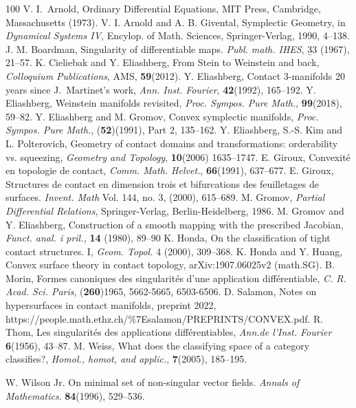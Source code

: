 \documentclass[12pt]{amsart}
\theoremstyle{plain}
\theoremstyle{definition}
\theoremstyle{remark}
\begin{document}

\begin{thebibliography}{100}
 V. I.~Arnold,   Ordinary Differential Equations,
  MIT Press, Cambridge, Massachusetts (1973). 
   V. I. Arnold and A. B. Givental, Symplectic Geometry, in  {\em Dynamical Systems IV}, Encylop. of Math. Sciences, Springer-Verlag, 1990, 4--138.
 J. M. Boardman, Singularity of differentiable maps. {\em Publ. math. IHES}, {\b 33} (1967), 21--57.
 K. Cieliebak and Y. Eliashberg, From Stein to Weinstein and back, {\em Colloquium Publications},  AMS,
 {\bf 59}(2012).
  Y. Eliashberg, {Contact 3-manifolds 20 years since J.~Martinet's work},
 {\sl Ann. Inst. Fourier}, {\bf 42}(1992), 165--192.
  Y. Eliashberg, Weinstein manifolds revisited,   {\it Proc. Sympos. Pure Math.}, {\bf 99}(2018),   59--82. 
   Y. Eliashberg and M. Gromov, Convex symplectic manifolds, {\em Proc. 
Sympos. Pure Math.},
({\bf 52})(1991), Part 2, 135--162.
 Y. Eliashberg, S.-S. Kim and L. Polterovich,  Geometry of contact domains and transformations: orderability vs.
   squeezing,   {\it Geometry and Topology}, {\bf 10}(2006) 1635--1747.
 E. Giroux, Convexit\'e en topologie de contact, {\em Comm. Math. Helvet.}, {\bf 66}(1991), 637–677.
 E. Giroux,  Structures de contact en dimension trois et bifurcations des feuilletages de surfaces. \textit{Invent. Math} Vol. 144, no. 3,  (2000), 
615--689.
 M. Gromov, {\em Partial Differential Relations}, { Springer-Verlag}, Berlin-Heidelberg, 1986.
 M. Gromov and Y. Eliashberg, Construction of a smooth mapping with the prescribed
Jacobian, {\em Funct. anal. i pril.,} {\bf 14} (1980),
  89--90
 K. Honda, On the classification of tight contact structures. I, {\em Geom. Topol.} 4 (2000), 309--368.  
 K. Honda and Y. Huang, Convex surface theory in contact topology,  arXiv:1907.06025v2 (math.SG).
 B. Morin, Formes canoniques des singularit\'es d’une application diff\'erentiable, {\em C. R. Acad.
Sci. Paris}, ({\bf 260})1965, 5662-5665, 6503-6506.
 D.\,\,Salamon, Notes on hypersurfaces in contact manifolds, preprint 2022, https://people.math.ethz.ch/\%7Esalamon/PREPRINTS/CONVEX.pdf.
 R. Thom, Les singularit\'es des applications différentiables, {\em Ann.de l'Inst. Fourier}
 {\bf 6}(1956), 43--87.
 M. Weiss,   What does the classifying space of a category classifies?, {\em Homol., homot, and applic.}, {\bf 7}(2005), 185--195.

   W. Wilson Jr. On minimal set of non-singular vector fields. \textit{Annals of Mathematics}. {\bf 84}(1996), 529--536.
\end{thebibliography}











          



     
     
     
     
     
     
   
\end{document}

